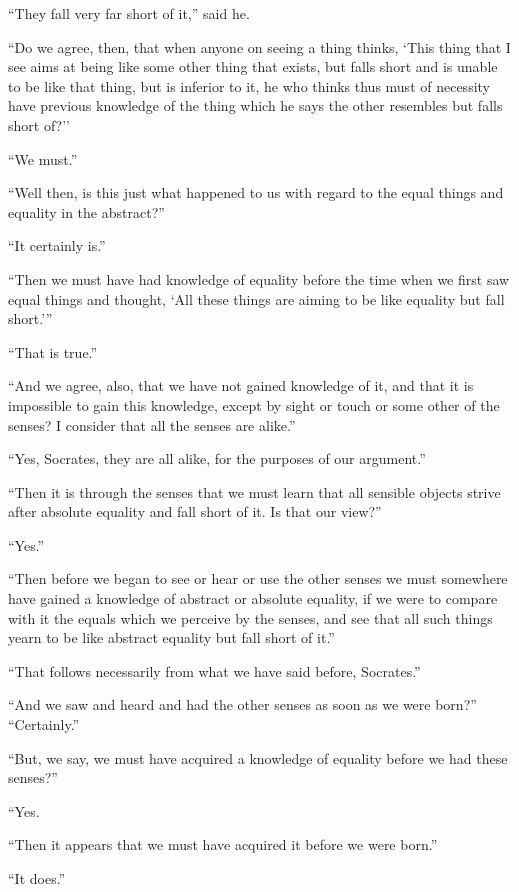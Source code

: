 \documentclass[letterpaper,12pt]{article}
\newcommand{\stephpag}[1]{\marginnote{\small\itshape\fontfamily{ppl}\selectfont #1}}
\begin{document}
\begin{drama}
``They fall very far short of it,'' said he.
 
``Do we agree, then, that when anyone on seeing a thing thinks, `This thing that I see aims at being like some other thing that exists, but falls short \stephpag{e} and is unable to be like that thing, but is inferior to it, he who thinks thus must of necessity have previous knowledge of the thing which he says the other resembles but falls short of?''
 
``We must.''
 
``Well then, is this just what happened to us with regard to the equal things and equality in the abstract?''
 
``It certainly is.''
 
``Then we must have had knowledge of equality \stephpag{75 a} before the time when we first saw equal things and thought, ‘All these things are aiming to be like equality but fall short.’''
 
``That is true.''
 
``And we agree, also, that we have not gained knowledge of it, and that it is impossible to gain this knowledge, except by sight or touch or some other of the senses? I consider that all the senses are alike.''
 
``Yes, Socrates, they are all alike, for the purposes of our argument.''
 
``Then it is through the senses that we must learn \stephpag{b} that all sensible objects strive after absolute equality and fall short of it. Is that our view?''
 
``Yes.''
 
``Then before we began to see or hear or use the other senses we must somewhere have gained a knowledge of abstract or absolute equality, if we were to compare with it the equals which we perceive by the senses, and see that all such things yearn to be like abstract equality but fall short of it.''
 
``That follows necessarily from what we have said before, Socrates.''
 
``And we saw and heard and had the other senses as soon as we were born?'' \stephpag{c} ``Certainly.''
 
``But, we say, we must have acquired a knowledge of equality before we had these senses?''
 
``Yes.
 
``Then it appears that we must have acquired it before we were born.''
 
``It does.''
 

\end{drama}
\end{document}

